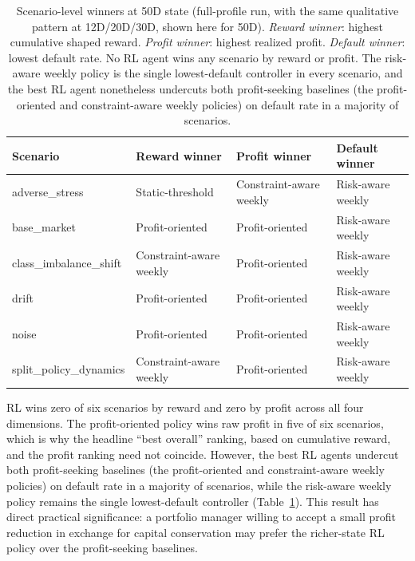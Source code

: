 \documentclass[preprint,review,authoryear,12pt]{elsarticle}
\begin{document}
\begin{table}[t]
    \centering
    \small
    \caption{Scenario-level winners at 50D state (full-profile run, with the same
        qualitative pattern at 12D/20D/30D, shown here for 50D). \textit{Reward winner}: highest
        cumulative shaped reward. \textit{Profit winner}: highest realized profit.
        \textit{Default winner}: lowest default rate. No RL agent wins any scenario by reward
        or profit. The risk-aware weekly policy is the single lowest-default controller in
        every scenario, and the best RL agent nonetheless undercuts both profit-seeking
        baselines (the profit-oriented and constraint-aware weekly policies) on default rate
        in a majority of scenarios.}
    \label{tab:scenario-winners}
    \setlength{\tabcolsep}{4pt}
    \begin{tabular}{>{\ttfamily}l l l l}
        \toprule
        Scenario                & Reward winner           & Profit winner           & Default winner    \\
        \midrule
        adverse\_stress         & Static-threshold        & Constraint-aware weekly & Risk-aware weekly \\
        base\_market            & Profit-oriented         & Profit-oriented         & Risk-aware weekly \\
        class\_imbalance\_shift & Constraint-aware weekly & Profit-oriented         & Risk-aware weekly \\
        drift                   & Profit-oriented         & Profit-oriented         & Risk-aware weekly \\
        noise                   & Profit-oriented         & Profit-oriented         & Risk-aware weekly \\
        split\_policy\_dynamics & Constraint-aware weekly & Profit-oriented         & Risk-aware weekly \\
        \bottomrule
    \end{tabular}
\end{table}

RL wins zero of six scenarios by reward and zero by profit across all four dimensions.
The profit-oriented policy wins raw profit in five of six scenarios, which is why the
headline ``best overall'' ranking, based on cumulative reward, and the profit ranking
need not coincide. However, the best RL agents undercut both profit-seeking baselines
(the profit-oriented and constraint-aware weekly policies) on default rate in a majority
of scenarios, while the risk-aware weekly policy remains the single lowest-default
controller (Table~\ref{tab:scenario-winners}). This result has direct practical
significance: a portfolio manager willing to accept a small profit reduction in exchange
for capital conservation may prefer the richer-state RL policy over the profit-seeking
baselines.
\end{document}
